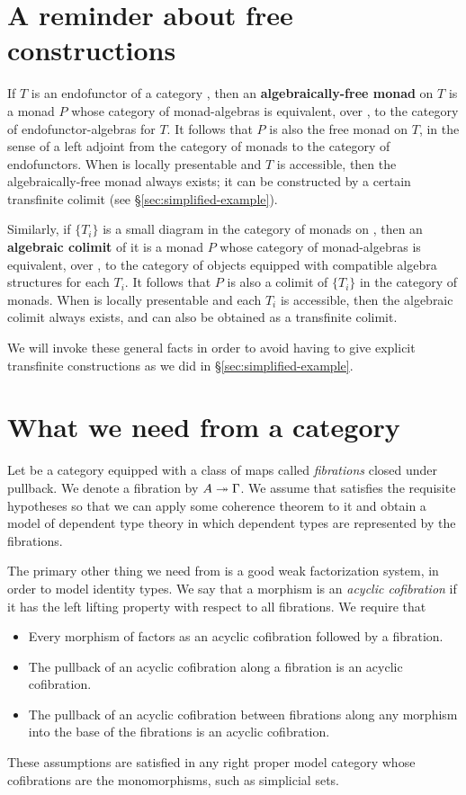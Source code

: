 \documentclass{amsart}
\begin{document}
\section{A reminder about free constructions}
\label{sec:free}

If $T$ is an endofunctor of a category \sC, then an \textbf{algebraically-free monad} on $T$ is a monad $P$ whose category of monad-algebras is equivalent, over \sC, to the category of endofunctor-algebras for $T$.
It follows that $P$ is also the free monad on $T$, in the sense of a left adjoint from the category of monads to the category of endofunctors.
When \sC is locally presentable and $T$ is accessible, then the algebraically-free monad always exists; it can be constructed by a certain transfinite colimit (see \S\ref{sec:simplified-example}).

Similarly, if $\{T_i\}$ is a small diagram in the category of monads on \sC, then an \textbf{algebraic colimit} of it is a monad $P$ whose category of monad-algebras is equivalent, over \sC, to the category of objects equipped with compatible algebra structures for each $T_i$.
It follows that $P$ is also a colimit of $\{T_i\}$ in the category of monads.
When \sC is locally presentable and each $T_i$ is accessible, then the algebraic colimit always exists, and can also be obtained as a transfinite colimit.

We will invoke these general facts in order to avoid having to give explicit transfinite constructions as we did in \S\ref{sec:simplified-example}.


\section{What we need from a category}
\label{sec:categorical-setup}

Let \sC be a category equipped with a class of maps called \emph{fibrations} closed under pullback.
We denote a fibration by $A \twoheadrightarrow \Gamma$.
We assume that \sC satisfies the requisite hypotheses so that we can apply some coherence theorem to it and obtain a model of dependent type theory in which dependent types are represented by the fibrations.

The primary other thing we need from \sC is a good weak factorization system, in order to model identity types.
We say that a morphism is an \emph{acyclic cofibration} if it has the left lifting property with respect to all fibrations.
We require that
\begin{itemize}
\item Every morphism of \sC factors as an acyclic cofibration followed by a fibration.
\item The pullback of an acyclic cofibration along a fibration is an acyclic cofibration.
\item The pullback of an acyclic cofibration between fibrations along any morphism into the base of the fibrations is an acyclic cofibration.
\end{itemize}
These assumptions are satisfied in any right proper model category whose cofibrations are the monomorphisms, such as simplicial sets.
\end{document}
